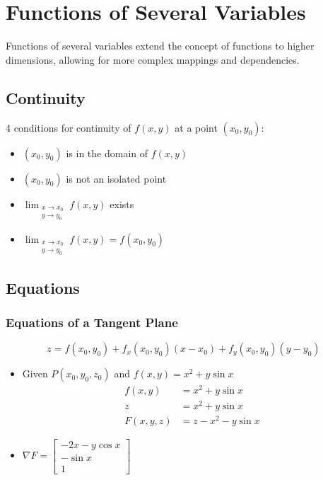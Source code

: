 \chapter{Functions of Several Variables}
Functions of several variables extend the concept of functions to higher dimensions, allowing for more complex mappings and dependencies.

\section{Continuity}

4 conditions for continuity of $f(x, y)$ at a point $(x_0, y_0)$:

\begin{itemize}
    \item $(x_0, y_0)$ is in the domain of $f(x, y)$
    \item $(x_0, y_0)$ is not an isolated point
    \item $\lim_{\substack{x \to x_0\\y \to y_0}} f(x, y)$ exists
    \item $\lim_{\substack{x \to x_0\\y \to y_0}} f(x, y) = f(x_0, y_0)$
\end{itemize}

\section{Equations}

\subsection{Equations of a Tangent Plane}
\begin{equation} \label{Tangent Plane}
    z = f(x_0, y_0) + f_x(x_0, y_0)(x - x_0) + f_y(x_0, y_0)(y - y_0)
\end{equation}
\begin{itemize}
    \item Given $P(x_0, y_0, z_0)$ and $f(x, y) = x^2 + y\sin x$
    \begin{align*}
        f(x,y) &= x^2 + y\sin x \\
        z &= x^2 + y\sin x \\
        F(x, y, z) &= z - x^2 - y\sin x
    \end{align*}
    \item $\nabla F = 
    \begin{bmatrix} 
    -2x - y\cos x \\ 
    -\sin x \\ 1 
    \end{bmatrix}$
\end{itemize}